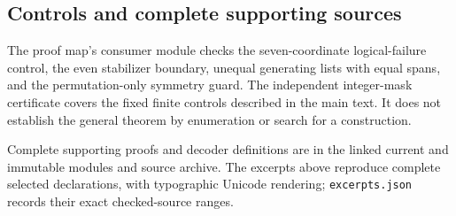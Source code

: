 \subsection{Controls and complete supporting sources}
The proof map's consumer module checks the seven-coordinate logical-failure control, the even stabilizer boundary, unequal generating lists with equal spans, and the permutation-only symmetry guard. The independent integer-mask certificate covers the fixed finite controls described in the main text. It does not establish the general theorem by enumeration or search for a construction.

Complete supporting proofs and decoder definitions are in the linked current and immutable modules and source archive. The excerpts above reproduce complete selected declarations, with typographic Unicode rendering; \texttt{excerpts.json} records their exact checked-source ranges.
